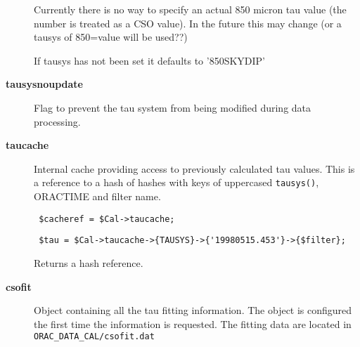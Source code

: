 \begin{description}
Currently there is no way to specify an actual 850 micron
tau value (the number is treated as a CSO value). In the future
this may change (or a tausys of 850=value will be used??)



If tausys has not been set it defaults to '850SKYDIP'

\item[\textbf{tausysnoupdate}] \mbox{}

Flag to prevent the tau system from being modified during data
processing.

\item[\textbf{taucache}] \mbox{}

Internal cache providing access to previously calculated tau values.
This is a reference to a hash of hashes with keys of uppercased
\texttt{tausys()}, ORACTIME and filter name.

\begin{verbatim}
 $cacheref = $Cal->taucache;
\end{verbatim}
\begin{verbatim}
 $tau = $Cal->taucache->{TAUSYS}->{'19980515.453'}->{$filter};
\end{verbatim}


Returns a hash reference.

\item[\textbf{csofit}] \mbox{}

Object containing all the tau fitting information.
The object is configured the first time the information
is requested. The fitting data are located in
\texttt{ORAC\_DATA\_CAL/csofit.dat}

\end{description}
